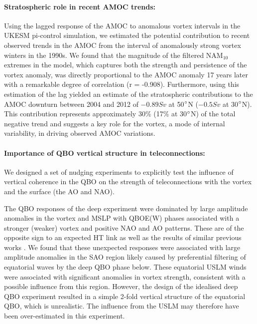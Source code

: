 \paragraph{Stratospheric role in recent AMOC trends:}
Using the lagged response of the AMOC to anomalous vortex intervals in the UKESM pi-control simulation, we estimated the potential contribution to recent observed trends in the AMOC from the interval of anomalously strong vortex winters in the 1990s. We found that the magnitude of the filtered NAM$_{10}$ extremes in the model, which captures both the strength and persistence of the vortex anomaly, was directly proportional to the AMOC anomaly 17 years later with a remarkable degree of correlation (r = -0.908). Furthermore, using this estimation of the lag yielded an estimate of the stratospheric contributions to the AMOC downturn between 2004 and 2012 of $-0.89Sv$ at 50$\degree$N ($-0.5Sv$ at 30$\degree$N). This contribution represents approximately 30\% (17\% at 30$\degree$N) of the total negative trend and suggests a key role for the vortex, a mode of internal variability, in driving observed AMOC variations. 

\paragraph{Importance of QBO vertical structure in teleconnections:}
We designed a set of nudging experiments to explicitly test the influence of vertical coherence in the QBO on the strength of teleconnections with the vortex and the surface (the AO and NAO).

The QBO responses of the deep experiment were dominated by large amplitude anomalies in the vortex and MSLP with QBOE(W) phases associated with a stronger (weaker) vortex and positive NAO and AO patterns. These are of the opposite sign to an expected HT link as well as the results of similar previous works \citep{graySurface2018b, andrewsObserved2019d}. We found that these unexpected responses were associated with large amplitude anomalies in the SAO region likely caused by preferential filtering of equatorial waves by the deep QBO phase below. These equatorial USLM winds were associated with significant anomalies in vortex strength, consistent with a possible influence from this region. However, the design of the idealised deep QBO experiment resulted in a simple 2-fold vertical structure of the equatorial QBO, which is unrealistic. The influence from the USLM may therefore have been over-estimated in this experiment.

